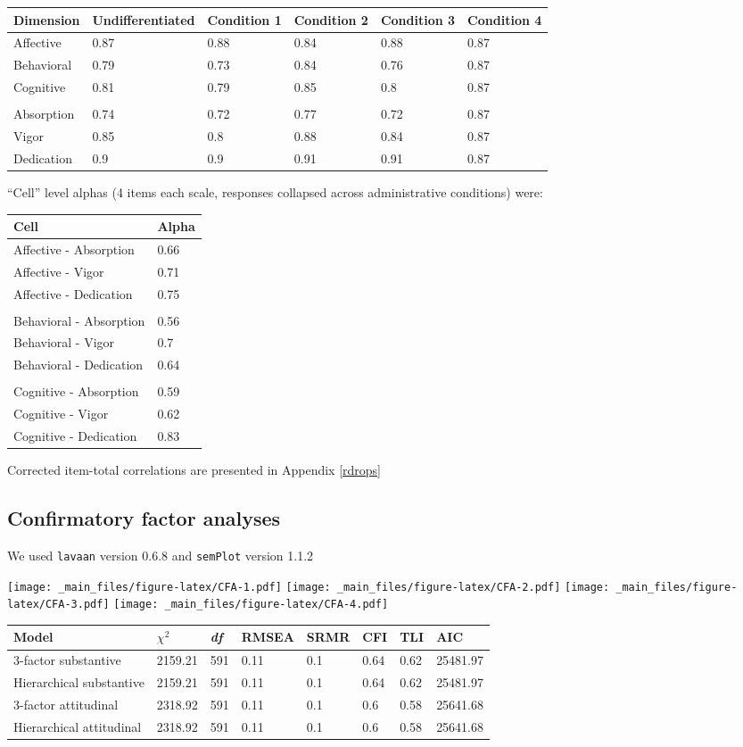 \documentclass[
]{book}
\begin{document}
\begin{longtable}[]{@{}llllll@{}}
\toprule
Dimension & Undifferentiated & Condition 1 & Condition 2 & Condition 3 & Condition 4\tabularnewline
\midrule
\endhead
Affective & 0.87 & 0.88 & 0.84 & 0.88 & 0.87\tabularnewline
Behavioral & 0.79 & 0.73 & 0.84 & 0.76 & 0.87\tabularnewline
Cognitive & 0.81 & 0.79 & 0.85 & 0.8 & 0.87\tabularnewline
& & & & &\tabularnewline
Absorption & 0.74 & 0.72 & 0.77 & 0.72 & 0.87\tabularnewline
Vigor & 0.85 & 0.8 & 0.88 & 0.84 & 0.87\tabularnewline
Dedication & 0.9 & 0.9 & 0.91 & 0.91 & 0.87\tabularnewline
\bottomrule
\end{longtable}

``Cell'' level alphas (4 items each scale, responses collapsed across administrative conditions) were:

\begin{longtable}[]{@{}ll@{}}
\toprule
Cell & Alpha\tabularnewline
\midrule
\endhead
Affective - Absorption & 0.66\tabularnewline
Affective - Vigor & 0.71\tabularnewline
Affective - Dedication & 0.75\tabularnewline
&\tabularnewline
Behavioral - Absorption & 0.56\tabularnewline
Behavioral - Vigor & 0.7\tabularnewline
Behavioral - Dedication & 0.64\tabularnewline
&\tabularnewline
Cognitive - Absorption & 0.59\tabularnewline
Cognitive - Vigor & 0.62\tabularnewline
Cognitive - Dedication & 0.83\tabularnewline
\bottomrule
\end{longtable}

Corrected item-total correlations are presented in Appendix \ref{rdrops}

\hypertarget{confirmatory-factor-analyses}{%
\subsection{Confirmatory factor analyses}\label{confirmatory-factor-analyses}}

We used \texttt{lavaan} version 0.6.8 \citep{R-lavaan} and \texttt{semPlot} version 1.1.2 \citep{R-semPlot}

\texttt{[image: \_main\_files/figure-latex/CFA-1.pdf]} \texttt{[image: \_main\_files/figure-latex/CFA-2.pdf]} \texttt{[image: \_main\_files/figure-latex/CFA-3.pdf]} \texttt{[image: \_main\_files/figure-latex/CFA-4.pdf]}

\begin{longtable}[]{@{}llllllll@{}}
\toprule
Model & \(\chi^2\) & \emph{df} & RMSEA & SRMR & CFI & TLI & AIC\tabularnewline
\midrule
\endhead
3-factor substantive & 2159.21 & 591 & 0.11 & 0.1 & 0.64 & 0.62 & 25481.97\tabularnewline
Hierarchical substantive & 2159.21 & 591 & 0.11 & 0.1 & 0.64 & 0.62 & 25481.97\tabularnewline
3-factor attitudinal & 2318.92 & 591 & 0.11 & 0.1 & 0.6 & 0.58 & 25641.68\tabularnewline
Hierarchical attitudinal & 2318.92 & 591 & 0.11 & 0.1 & 0.6 & 0.58 & 25641.68\tabularnewline
\bottomrule
\end{longtable}
\end{document}
